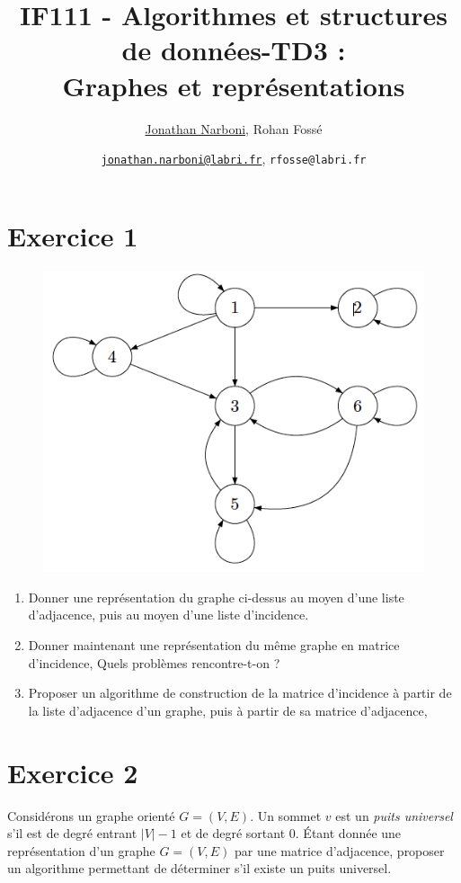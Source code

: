 \documentclass[10pt,a4paper]{article}
\title{IF111 - Algorithmes et structures de données-TD3 :\\ Graphes et représentations}
\date{}
\author{\underline{Jonathan Narboni}, Rohan Fossé}
\date{\underline{\texttt{jonathan.narboni@labri.fr}}, \texttt{rfosse@labri.fr}}
\begin{document}
\maketitle

\section*{Exercice 1}
\begin{figure}[h]
    \centering
    \includegraphics[scale=0.3]{Graphe1.png}
    \label{fig:my_label}
\end{figure}
\begin{enumerate}
    \item Donner une représentation du graphe ci-dessus au moyen d'une liste d'adjacence, puis au moyen d'une liste d'incidence.
    \item Donner maintenant une représentation du même graphe en matrice d'incidence, Quels problèmes rencontre-t-on ?
    \item Proposer un algorithme de construction de la matrice d'incidence à partir de la liste d'adjacence d'un graphe, puis à partir de sa matrice d'adjacence,
\end{enumerate}


\section*{Exercice 2}
Considérons un graphe orienté $G = (V, E)$. Un sommet $v$ est un \textit{puits universel} s'il est de degré entrant $|V| - 1$ et de degré sortant 0.
Étant donnée une représentation d'un graphe $G = (V, E)$ par une matrice d'adjacence, proposer un algorithme permettant de déterminer s'il existe un puits universel.
\end{document}
